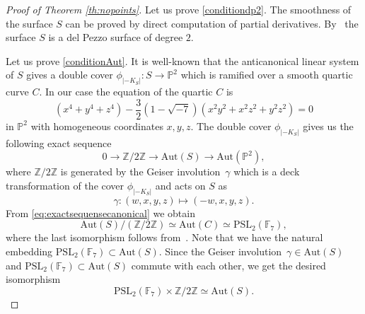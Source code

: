 \documentclass[10pt,a4paper]{amsart}
\begin{document}
\begin{proof}[Proof of Theorem \ref{th:nopoints}]
Let us prove \ref{conditiondp2}. The smoothness of the surface $S$ can be proved by direct computation of partial derivatives. By~\cite[Proposition 6.3.6]{Dolgachev} the surface $S$ is a del Pezzo surface of degree $2.$



Let us prove \ref{conditionAut}. It is well-known that the anticanonical linear system of $S$ gives a double cover $\phi_{|-K_S|}:S \to \mathbb{P}^2$ which is ramified over a smooth quartic curve $C$. In our case the equation of the quartic $C$ is 
\begin{equation}\label{eq:quarticcurve}
(x^4+y^4+z^4)-\frac{3}{2}(1-\sqrt{-7})(x^2y^2+x^2z^2+y^2z^2)=0
\end{equation}
\noindent in $\mathbb{P}^2$ with homogeneous coordinates $x,y,z.$  The double cover $\phi_{|-K_S|}$ gives us the following exact sequence
\begin{equation}\label{eq:exactsequensecanonical}
0 \to \mathbb{Z}/2\mathbb{Z} \to \mathrm{Aut}(S) \to \mathrm{Aut}(\mathbb{P}^2),
\end{equation}
\noindent where $\mathbb{Z}/2\mathbb{Z}$ is generated by the Geiser involution~$\gamma$ which is a deck transformation of the cover  $\phi_{|-K_S|}$ and  acts on $S$ as 
$$
\gamma:(w,x,y,z) \mapsto (-w,x,y,z).
$$
\noindent From \eqref{eq:exactsequensecanonical} we obtain
\begin{equation}\label{eq:aut}
\mathrm{Aut}(S)/\left(\mathbb{Z}/2\mathbb{Z}\right) \simeq \mathrm{Aut}(C) \simeq \mathrm{PSL}_2(\mathbb{F}_7),
\end{equation}
\noindent where the last isomorphism follows  from~\cite[Chapter 1]{Elkies}. Note that we have the natural embedding $\mathrm{PSL}_2(\mathbb{F}_7) \subset \mathrm{Aut}(S).$  Since  the Geiser involution~\mbox{$\gamma \in \mathrm{Aut}(S)$} and $\mathrm{PSL}_2(\mathbb{F}_7) \subset \mathrm{Aut}(S)$ commute with each other, we get the desired isomorphism
$$
\mathrm{PSL}_2(\mathbb{F}_7) \times \mathbb{Z}/2\mathbb{Z} \simeq \mathrm{Aut}(S).
$$















\end{proof}
\end{document}
